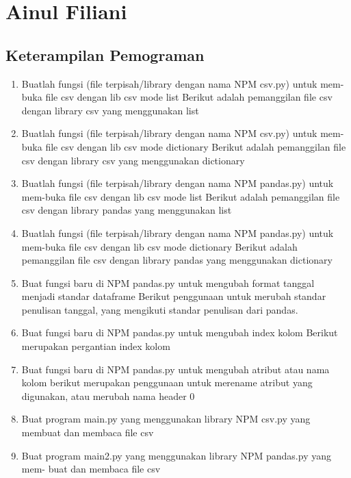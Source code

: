 
\section{Ainul Filiani}

\subsection{Keterampilan Pemograman}

\begin{enumerate}

\item Buatlah fungsi (file terpisah/library dengan nama NPM csv.py) untuk mem-buka file csv dengan lib csv mode list
Berikut adalah pemanggilan file csv dengan library csv yang menggunakan list

\item Buatlah fungsi (file terpisah/library dengan nama NPM csv.py) untuk mem-buka file csv dengan lib csv mode dictionary Berikut adalah pemanggilan file csv dengan library csv yang menggunakan dictionary

\item Buatlah fungsi (file terpisah/library dengan nama NPM pandas.py) untuk mem-buka file csv dengan lib csv mode list Berikut adalah pemanggilan file csv dengan library pandas yang menggunakan list

\item Buatlah fungsi (file terpisah/library dengan nama NPM pandas.py) untuk mem-buka file csv dengan lib csv mode dictionary Berikut adalah pemanggilan file csv dengan library pandas yang menggunakan dictionary

\item Buat fungsi baru di NPM pandas.py untuk mengubah format tanggal menjadi standar dataframe
Berikut penggunaan untuk merubah standar penulisan tanggal, yang mengikuti standar penulisan dari pandas.

\item Buat fungsi baru di NPM pandas.py untuk mengubah index kolom
Berikut merupakan pergantian index kolom

\item Buat fungsi baru di NPM pandas.py untuk mengubah atribut atau nama kolom berikut merupakan penggunaan untuk merename atribut yang digunakan, atau merubah nama header 0

\item Buat program main.py yang menggunakan library NPM csv.py yang membuat dan membaca 
file csv

\item Buat program main2.py yang menggunakan library NPM pandas.py yang mem- buat dan membaca 
file csv


\end{enumerate}


